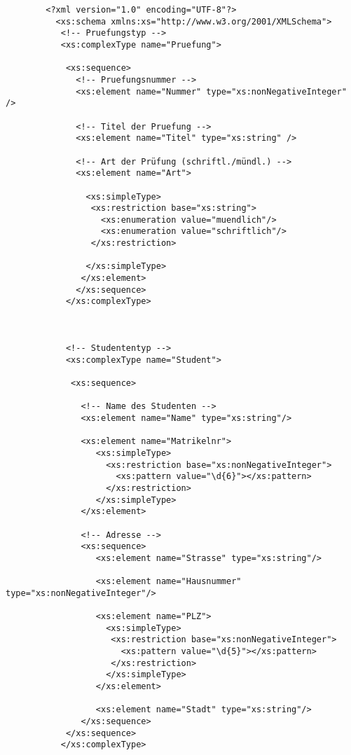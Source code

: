 
	\begin{verbatim}
		<?xml version="1.0" encoding="UTF-8"?>
		  <xs:schema xmlns:xs="http://www.w3.org/2001/XMLSchema">
		   <!-- Pruefungstyp -->
		   <xs:complexType name="Pruefung">
		
		    <xs:sequence>
		      <!-- Pruefungsnummer -->
		      <xs:element name="Nummer" type="xs:nonNegativeInteger" />
		
		      <!-- Titel der Pruefung -->
		      <xs:element name="Titel" type="xs:string" />
		
		      <!-- Art der Prüfung (schriftl./mündl.) -->
		      <xs:element name="Art">
		 
		        <xs:simpleType>
		         <xs:restriction base="xs:string">
		           <xs:enumeration value="muendlich"/>
		           <xs:enumeration value="schriftlich"/>
		         </xs:restriction>
		
		        </xs:simpleType>
		       </xs:element>
		      </xs:sequence>
		    </xs:complexType>
		
		
		
		    <!-- Studententyp -->
		    <xs:complexType name="Student">
		    
		     <xs:sequence>
		     
		       <!-- Name des Studenten -->
		       <xs:element name="Name" type="xs:string"/>
		
		       <xs:element name="Matrikelnr">
		          <xs:simpleType>
		            <xs:restriction base="xs:nonNegativeInteger">
		              <xs:pattern value="\d{6}"></xs:pattern>
		            </xs:restriction>
		          </xs:simpleType>
		       </xs:element>
		       
		       <!-- Adresse -->
		       <xs:sequence>
		          <xs:element name="Strasse" type="xs:string"/>
		       
		          <xs:element name="Hausnummer" type="xs:nonNegativeInteger"/>
		       
		          <xs:element name="PLZ">
		            <xs:simpleType>
		             <xs:restriction base="xs:nonNegativeInteger">
		               <xs:pattern value="\d{5}"></xs:pattern>
		             </xs:restriction>
		            </xs:simpleType>
		          </xs:element>
		       
		          <xs:element name="Stadt" type="xs:string"/>
		       </xs:sequence>
		    </xs:sequence>
		   </xs:complexType>
		
		
		
		
		

\end{verbatim}
